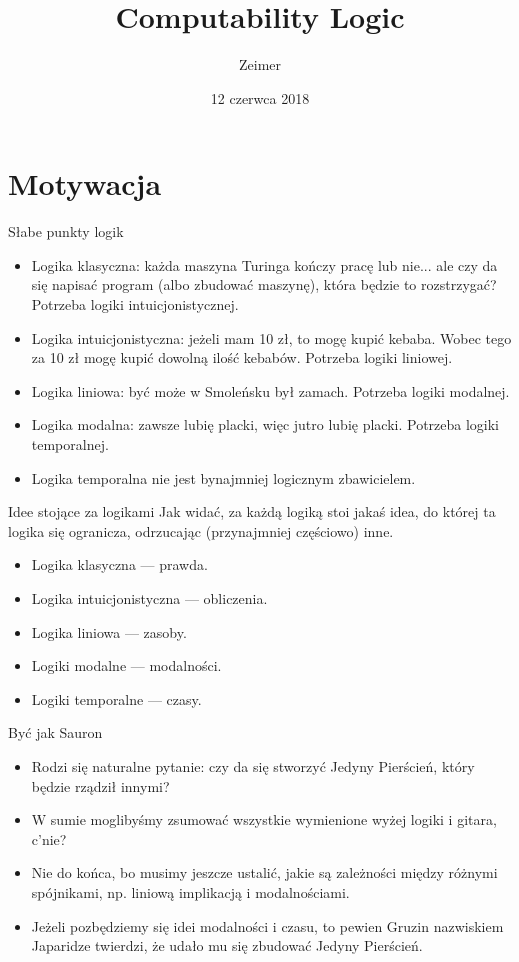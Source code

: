\documentclass{beamer}
\title{Computability Logic}
\author{Zeimer}
\date{12 czerwca 2018}
\begin{document}
\frame{\titlepage}

\frame{\tableofcontents}

\section{Motywacja}

\begin{frame}{Słabe punkty logik}
\begin{itemize}
	\item Logika klasyczna: każda maszyna Turinga kończy pracę lub nie... ale czy da się napisać program (albo zbudować maszynę), która będzie to rozstrzygać? Potrzeba logiki intuicjonistycznej.
	\item Logika intuicjonistyczna: jeżeli mam 10 zł, to mogę kupić kebaba. Wobec tego za 10 zł mogę kupić dowolną ilość kebabów. Potrzeba logiki liniowej.
	\item Logika liniowa: być może w Smoleńsku był zamach. Potrzeba logiki modalnej.
	\item Logika modalna: zawsze lubię placki, więc jutro lubię placki. Potrzeba logiki temporalnej.
	\item Logika temporalna nie jest bynajmniej logicznym zbawicielem.
\end{itemize}
\end{frame}

\begin{frame}{Idee stojące za logikami}
	Jak widać, za każdą logiką stoi jakaś idea, do której ta logika się ogranicza, odrzucając (przynajmniej częściowo) inne.
	\begin{itemize}
		\item Logika klasyczna — prawda.
		\item Logika intuicjonistyczna — obliczenia.
		\item Logika liniowa — zasoby.
		\item Logiki modalne — modalności.
		\item Logiki temporalne — czasy.
	\end{itemize}
\end{frame}

\begin{frame}{Być jak Sauron}
\begin{itemize}
	\item Rodzi się naturalne pytanie: czy da się stworzyć Jedyny Pierścień, który będzie rządził innymi?
	\item W sumie moglibyśmy zsumować wszystkie wymienione wyżej logiki i gitara, c'nie?
	\item Nie do końca, bo musimy jeszcze ustalić, jakie są zależności między różnymi spójnikami, np. liniową implikacją i modalnościami.
	\item Jeżeli pozbędziemy się idei modalności i czasu, to pewien Gruzin nazwiskiem Japaridze twierdzi, że udało mu się zbudować Jedyny Pierścień.
\end{itemize}
\end{frame}
\end{document}
